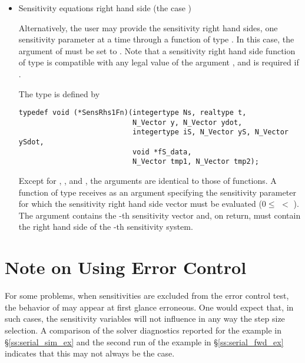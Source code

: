 \begin{itemize}
\item Sensitivity equations right hand side (the case )
  
  Alternatively, the user may provide the sensitivity right hand sides, one sensitivity
  parameter at a time through a function of type . 
  In this case, the argument  of  must be set to . 
  Note that a sensitivity right hand side function of type  is compatible with
  any legal value of the  argument , and is 
  required if .

  The type  is defined by
\begin{verbatim}
typedef void (*SensRhs1Fn)(integertype Ns, realtype t, 
                           N_Vector y, N_Vector ydot, 
                           integertype iS, N_Vector yS, N_Vector ySdot, 
                           void *fS_data,
                           N_Vector tmp1, N_Vector tmp2);
\end{verbatim}
  Except for , , and , the arguments are identical to those of 
   functions.
  A function of type  receives as an argument  specifying the
  sensitivity parameter for which the sensitivity right hand side vector must be
  evaluated ($0 \le$  $<$ ). The argument  contains the -th
  sensitivity vector and, on return,  must contain the right hand side of the
  -th sensitivity system.


%
\end{itemize}

\section{Note on Using  Error Control}\label{ss:partial}
For some problems, when sensitivities are excluded from the error control test, 
the behavior of {\cvodes} may appear at first glance erroneous. One would
expect that, in such cases, the sensitivity variables will not influence in
any way the step size selection. A comparison of the solver diagnostics 
reported for the  example in \S\ref{ss:serial_sim_ex} and the
second run of the  example in \S\ref{ss:serial_fwd_ex} indicates 
that this may not always be the case.


